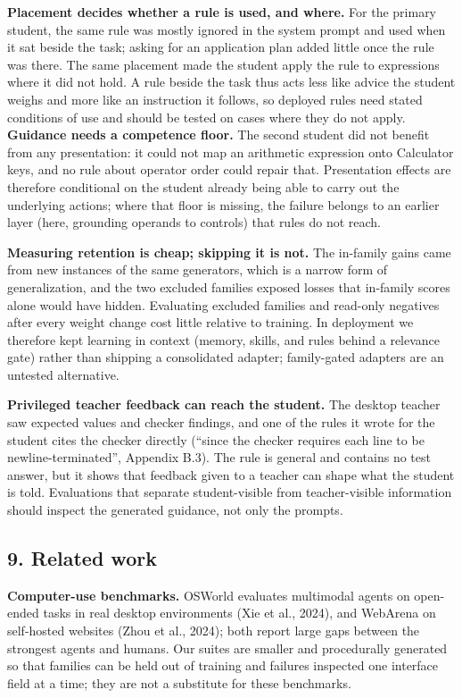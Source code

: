 \documentclass[
  10pt,
]{article}
\begin{document}
\textbf{Placement decides whether a rule is used, and where.} For the
primary student, the same rule was mostly ignored in the system prompt
and used when it sat beside the task; asking for an application plan
added little once the rule was there. The same placement made the
student apply the rule to expressions where it did not hold. A rule
beside the task thus acts less like advice the student weighs and more
like an instruction it follows, so deployed rules need stated conditions
of use and should be tested on cases where they do not apply.
\textbf{Guidance needs a competence floor.} The second student did not
benefit from any presentation: it could not map an arithmetic expression
onto Calculator keys, and no rule about operator order could repair
that. Presentation effects are therefore conditional on the student
already being able to carry out the underlying actions; where that floor
is missing, the failure belongs to an earlier layer (here, grounding
operands to controls) that rules do not reach.

\textbf{Measuring retention is cheap; skipping it is not.} The in-family
gains came from new instances of the same generators, which is a narrow
form of generalization, and the two excluded families exposed losses
that in-family scores alone would have hidden. Evaluating excluded
families and read-only negatives after every weight change cost little
relative to training. In deployment we therefore kept learning in
context (memory, skills, and rules behind a relevance gate) rather than
shipping a consolidated adapter; family-gated adapters are an untested
alternative.

\textbf{Privileged teacher feedback can reach the student.} The desktop
teacher saw expected values and checker findings, and one of the rules
it wrote for the student cites the checker directly (``since the checker
requires each line to be newline-terminated'', Appendix B.3). The rule
is general and contains no test answer, but it shows that feedback given
to a teacher can shape what the student is told. Evaluations that
separate student-visible from teacher-visible information should inspect
the generated guidance, not only the prompts.

\subsection{9. Related work}\label{related-work}

\textbf{Computer-use benchmarks.} OSWorld evaluates multimodal agents on
open-ended tasks in real desktop environments (Xie et al., 2024), and
WebArena on self-hosted websites (Zhou et al., 2024); both report large
gaps between the strongest agents and humans. Our suites are smaller and
procedurally generated so that families can be held out of training and
failures inspected one interface field at a time; they are not a
substitute for these benchmarks.
\end{document}

